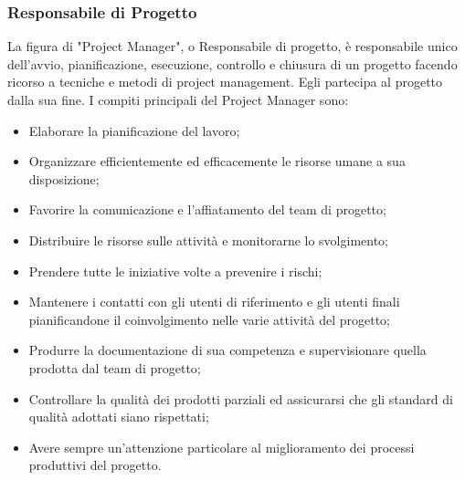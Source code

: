                 \subsubsection{Responsabile di Progetto}
                    La figura di "Project Manager", o Responsabile di progetto, è responsabile unico dell'avvio, pianificazione, esecuzione, controllo e chiusura di un progetto facendo ricorso a tecniche e metodi  di project management. Egli partecipa al progetto dalla sua  fine.
                    \newline
                    I compiti principali del Project Manager sono:
                    \begin{itemize}
                        \item Elaborare la pianificazione del lavoro;
                        \item Organizzare efficientemente ed efficacemente le risorse umane a sua disposizione;
                        \item Favorire la comunicazione e l'affiatamento del team di progetto;
                        \item Distribuire le risorse sulle attività e monitorarne lo svolgimento;
                        \item Prendere tutte le iniziative volte a prevenire i rischi;
                        \item Mantenere i contatti con gli utenti di riferimento e gli utenti finali pianificandone il coinvolgimento nelle varie attività del progetto;
                        \item Produrre la documentazione di sua competenza e supervisionare quella prodotta dal team di progetto;
                        \item Controllare la qualità dei prodotti parziali ed assicurarsi che gli standard di qualità adottati siano rispettati;
                        \item Avere sempre un'attenzione particolare al miglioramento dei processi produttivi del progetto.
                    \end{itemize}
